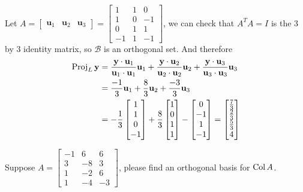 \documentclass[a4paper,10pt]{article}
\begin{document}
\begin{solution}
Let $A=\begin{bmatrix}
\mathbf u_1&\mathbf u_2&\mathbf u_3
\end{bmatrix}=\begin{bmatrix}
1&1&0\\
1&0&-1\\
0&1&1\\
-1&1&-1
\end{bmatrix}$, we can check that $A^TA=I$ is the 3 by 3 identity matrix, so $\mathcal B$ is an orthogonal set. And therefore
\begin{align*}
\operatorname{Proj}_L\mathbf y&=\frac{\mathbf y\cdot\mathbf u_1}{\mathbf u_1\cdot\mathbf u_1}\mathbf u_1+\frac{\mathbf y\cdot\mathbf u_2}{\mathbf u_2\cdot\mathbf u_2}\mathbf u_2+\frac{\mathbf y\cdot\mathbf u_3}{\mathbf u_3\cdot\mathbf u_3}\mathbf u_3\\
&=\frac{-1}{3}\mathbf u_1+\frac{8}{3}\mathbf u_2+\frac{-3}{3}\mathbf u_3\\
&=-\frac{1}{3}\begin{bmatrix}
1\\1\\0\\-1
\end{bmatrix}+\frac{8}{3}\begin{bmatrix}
1\\0\\1\\1
\end{bmatrix}-\begin{bmatrix}
0\\-1\\1\\-1
\end{bmatrix}=\begin{bmatrix}
\frac{7}{3}\\\frac{2}{3}\\\frac{5}{3}\\4
\end{bmatrix}
\end{align*}
\end{solution}

\begin{problem}
Suppose $A=\begin{bmatrix}
-1&6&6\\
3&-8&3\\
1&-2&6\\
1&-4&-3
\end{bmatrix}$, please find an orthogonal basis for $\operatorname{Col} A$.
\end{problem}
\end{document}
